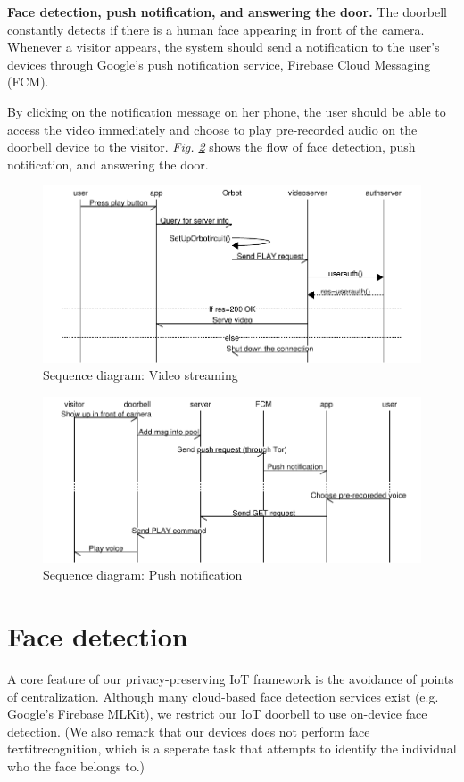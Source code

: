 \textbf{Face detection, push notification, and answering the door.} The doorbell constantly detects if there is a human face appearing in front of the camera. Whenever a visitor appears, the system should send a notification to the user's devices through Google's push notification service, Firebase Cloud Messaging (FCM).

By clicking on the notification message on her phone, the user should be able to access the video immediately and choose to play pre-recorded audio on the doorbell device to the visitor.
\textit{Fig. \ref{fig:push}} shows the flow of face detection, push notification, and answering the door.


\begin{figure}
	\includegraphics[width=\linewidth]{Sequence_diagram_playvideo.pdf}
	\caption{Sequence diagram: Video streaming}
	\label{fig:playvideo}
\end{figure}
\begin{figure}
	\includegraphics[width=\linewidth]{Sequence_diagram_push.pdf}
	\caption{Sequence diagram: Push notification}
	\label{fig:push}
\end{figure}


\section{Face detection}
A core feature of our privacy-preserving IoT framework is the avoidance of points of centralization. Although many cloud-based face detection services exist (e.g. Google's Firebase MLKit), we restrict our IoT doorbell to use on-device face detection. (We also remark that our devices does not perform face textit{recognition}, which is a seperate task that attempts to identify the individual who the face belongs to.) 

